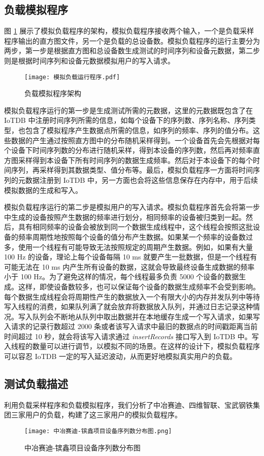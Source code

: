 \subsection{负载模拟程序}
图 \ref{fig:load-simulation-program} 展示了模拟负载程序的架构，模拟负载程序接收两个输入，一个是负载采样程序输出的直方图文件，另一个是负载的总设备数。模拟负载程序的运行主要分为两步，第一步是根据直方图和总设备数生成测试的时间序列和设备元数据，第二步则是根据时间序列和设备元数据模拟用户的写入请求。

\begin{figure}
  \centering
  \texttt{[image: 模拟负载运行程序.pdf]}
  \caption{负载模拟程序架构}
  \label{fig:load-simulation-program}
\end{figure}

模拟负载程序运行的第一步是生成测试所需的元数据，这里的元数据既包含了在 IoTDB 中注册时间序列所需的信息，如每个设备下的序列数、序列名称、序列类型，也包含了模拟程序产生数据点所需的信息，如序列的频率、序列的值分布。这些数据的产生通过按照直方图中的分布随机采样得到。一个设备首先会先根据对每个设备下时间序列数的分布进行随机采样，得到本设备的序列数，然后再对频率直方图采样得到本设备下所有时间序列的数据生成频率。然后对于本设备下的每个时间序列，再采样得到其数据类型、值分布等。最后，模拟负载程序一方面将时间序列的元数据注册到 IoTDB 中，另一方面也会将这些信息保存在内存中，用于后续模拟数据的生成和写入。

模拟负载程序运行的第二步是模拟用户的写入请求。模拟负载程序首先会将第一步中生成的设备按照产生数据的频率进行划分，相同频率的设备被归类到一起。然后，具有相同频率的设备会被放到同一个数据生成线程中，这个线程会按照这批设备的频率周期性地按照每个设备的值分布产生数据。如果某一个频率的设备数过多，使用一个线程有可能导致无法按照规定的周期产生数据。例如，如果有大量 100 Hz 的设备，理论上每个设备每隔 10 ms 就要产生一批数据，但是一个线程有可能无法在 10 ms 内产生所有设备的数据，这就会导致最终设备生成数据的频率小于 100 Hz。为了避免这样的情况，每个线程最多负责 5000 个设备的数据生成。这样，即使设备数较多，也可以保证每个设备的数据生成频率不会受到影响。每个数据生成线程会将周期性产生的数据放入一个有限大小的内存并发队列中等待写入线程的消费，如果队列满了就会放弃将数据放入队列，并通过日志记录这种情况。写入队列会不断地从队列中取出数据并在本地缓存生成一个写入请求，如果写入请求的记录行数超过 2000 条或者该写入请求中最旧的数据点的时间戳距离当前时间超过 10 秒，就会将该写入请求通过 \emph{insertRecords} 接口写入到 IoTDB 中。写入线程的数量可以进行调节，以模拟不同的场景。在这样的设计下，模拟负载程序可以容忍 IoTDB 一定的写入延迟波动，从而更好地模拟真实用户的负载。
\subsection{测试负载描述}
利用负载采样程序和负载模拟程序，我们分析了中冶赛迪、四维智联、宝武钢铁集团三家用户的负载，构建了这三家用户的模拟负载程序。
\begin{figure}
  \centering
  \texttt{[image: 中冶赛迪-镔鑫项目设备序列数分布图.png]}
  \caption{中冶赛迪-镔鑫项目设备序列数分布图}
  \label{fig:zysd-bx-device-measurement-count}
\end{figure}


